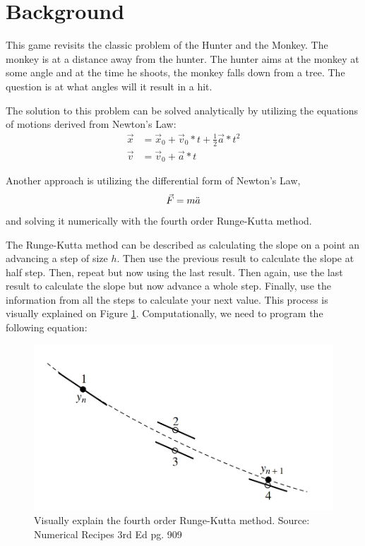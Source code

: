 \section*{Background}
This game revisits the classic problem of the Hunter and the Monkey. The monkey is at a distance away from the hunter. The hunter aims at the monkey at some angle and at the time he shoots, the monkey falls down from a tree. The question is at what angles will it result in a hit.

The solution to this problem can be solved analytically by utilizing the equations of motions derived from Newton's Law:
\begin{align}
    \vec{x} &= \vec{x}_0 + \Vec{v}_0*t + \frac{1}{2} \vec{a}*t^2 \\
    \vec{v} &= \vec{v}_0 + \vec{a}*t
\end{align}

Another approach is utilizing the differential form of Newton's Law, 
\begin{equation}
    \vec{F}=m\Ddot{a}
\end{equation}
and solving it numerically with the fourth order Runge-Kutta method. 

The Runge-Kutta method can be described as calculating the slope on a point an advancing a step of size $h$. Then use the previous result to calculate the slope at half step. Then, repeat but now using the last result. Then again, use the last result to calculate the slope but now advance a whole step. Finally, use the information from all the steps to calculate your next value. This process is visually explained on Figure \ref{fig:rk4Example}. Computationally, we need to program the following equation:

\begin{figure}[ht]
    \centering
    \includegraphics{rk4Example.png}
    \caption{Visually explain the fourth order Runge-Kutta method. \small{Source: Numerical Recipes 3rd Ed pg. 909}}
    \label{fig:rk4Example}
\end{figure}

